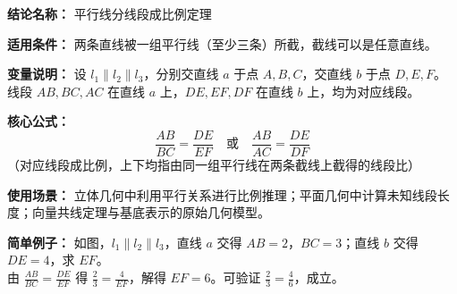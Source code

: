 \textbf{结论名称：} 平行线分线段成比例定理

\textbf{适用条件：} 两条直线被一组平行线（至少三条）所截，截线可以是任意直线。

\textbf{变量说明：} 设 $l_1\parallel l_2\parallel l_3$，分别交直线 $a$ 于点 $A,B,C$，交直线 $b$ 于点 $D,E,F$。线段 $AB,BC,AC$ 在直线 $a$ 上，$DE,EF,DF$ 在直线 $b$ 上，均为对应线段。

\textbf{核心公式：} 
\[
\boxed{\frac{AB}{BC} = \frac{DE}{EF}}
\quad\text{或}\quad
\boxed{\frac{AB}{AC} = \frac{DE}{DF}}
\]
（对应线段成比例，上下均指由同一组平行线在两条截线上截得的线段比）

\textbf{使用场景：} 立体几何中利用平行关系进行比例推理；平面几何中计算未知线段长度；向量共线定理与基底表示的原始几何模型。

\textbf{简单例子：} 如图，$l_1\parallel l_2\parallel l_3$，直线 $a$ 交得 $AB=2$，$BC=3$；直线 $b$ 交得 $DE=4$，求 $EF$。\\
由 $\frac{AB}{BC}=\frac{DE}{EF}$ 得 $\frac{2}{3}=\frac{4}{EF}$，解得 $EF=6$。可验证 $\frac{2}{3}=\frac{4}{6}$，成立。